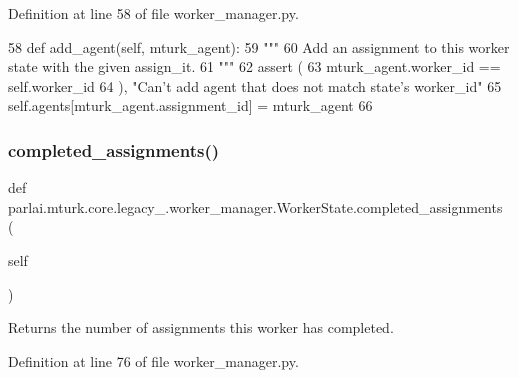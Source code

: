 Definition at line 58 of file worker\+\_\+manager.\+py.


\begin{DoxyCode}
58     \textcolor{keyword}{def }add\_agent(self, mturk\_agent):
59         \textcolor{stringliteral}{"""}
60 \textcolor{stringliteral}{        Add an assignment to this worker state with the given assign\_it.}
61 \textcolor{stringliteral}{        """}
62         \textcolor{keyword}{assert} (
63             mturk\_agent.worker\_id == self.worker\_id
64         ), \textcolor{stringliteral}{"Can't add agent that does not match state's worker\_id"}
65         self.agents[mturk\_agent.assignment\_id] = mturk\_agent
66 
\end{DoxyCode}
\mbox{\label{classparlai_1_1mturk_1_1core_1_1legacy__2018_1_1worker__manager_1_1WorkerState_a8ddde60a6054ad699818c749e310cb91}} 
\subsubsection{\texorpdfstring{completed\+\_\+assignments()}{completed\_assignments()}}
{\footnotesize\ttfamily def parlai.\+mturk.\+core.\+legacy\+\_.\+worker\+\_\+manager.\+Worker\+State.\+completed\+\_\+assignments (\begin{DoxyParamCaption}\item[{}]{self }\end{DoxyParamCaption})}

\begin{DoxyVerb}Returns the number of assignments this worker has completed.
\end{DoxyVerb}
 

Definition at line 76 of file worker\+\_\+manager.\+py.


